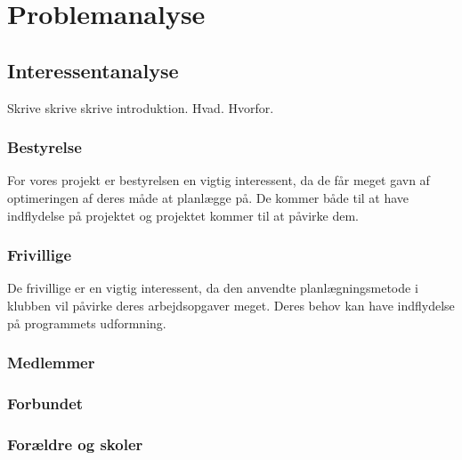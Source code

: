 \chapter{Problemanalyse}\label{ch:ch2label}












\section{Interessentanalyse}
Skrive skrive skrive introduktion. Hvad. Hvorfor.

\subsection{Bestyrelse}
For vores projekt er bestyrelsen en vigtig interessent, da de får meget gavn af optimeringen af deres måde at planlægge på. De kommer både til at have indflydelse på projektet og projektet kommer til at påvirke dem. 

\subsection{Frivillige}
De frivillige er en vigtig interessent, da den anvendte planlægningsmetode i klubben vil påvirke deres arbejdsopgaver meget. Deres behov kan have indflydelse på programmets udformning. 

\subsection{Medlemmer}


\subsection{Forbundet}


\subsection{Forældre og skoler}



